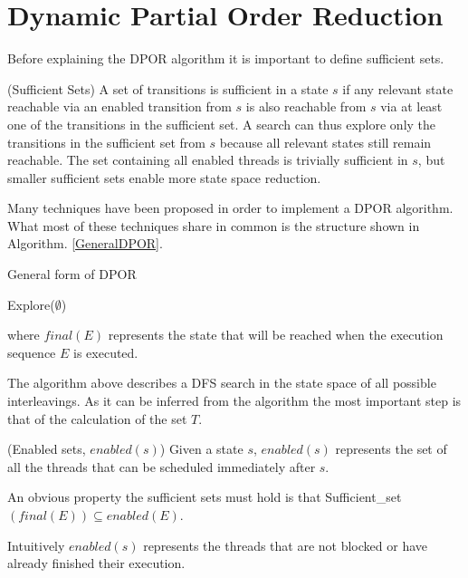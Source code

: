 \section{Dynamic Partial Order Reduction}

Before explaining the DPOR algorithm it is important to define sufficient sets.

\begin{definition}{(Sufficient Sets)}
A set of transitions is sufficient in a state $s$ if any relevant
state reachable via an enabled transition from $s$ is also reachable from $s$ via at least one of the transitions in the sufficient
set. A search can thus explore only the transitions in the
sufficient set from $s$ because all relevant states still remain
reachable. The set containing all enabled threads is trivially
sufficient in $s$, but smaller sufficient sets enable more state
space reduction.
\end{definition}

Many techniques have been proposed in order to implement a DPOR algorithm. What most of these techniques share in common is the structure shown in Algorithm.
\ref{GeneralDPOR}.

\begin{algorithm}[H]
    \caption{General form of DPOR}
    \label{GeneralDPOR}
    Explore($\emptyset$)\;
\end{algorithm}

where $final(E)$ represents the state that will be reached when the execution sequence $E$ is executed.

The algorithm above describes a DFS search in the state space of all possible interleavings.
As it can be inferred from the algorithm the most important step is that of the calculation of the set $T$.

\begin{definition}{(Enabled sets, $enabled(s)$)}
    Given a state $s$, $enabled(s)$ represents the set of all the threads that can be scheduled immediately after $s$.
\end{definition}

An obvious property the sufficient sets must hold is that Sufficient\_set$(final(E)) \subseteq enabled(E)$.

Intuitively $enabled(s)$ represents the threads that are not blocked or have already finished their execution.

